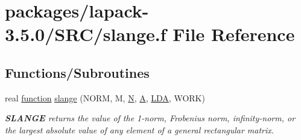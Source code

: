 \hypertarget{slange_8f}{}\section{packages/lapack-\/3.5.0/\+S\+R\+C/slange.f File Reference}
\label{slange_8f}
\subsection*{Functions/\+Subroutines}
\begin{DoxyCompactItemize}
\item 
real \hyperlink{afunc_8m_a7b5e596df91eadea6c537c0825e894a7}{function} \hyperlink{group__realGEauxiliary_ga459d27829607393670ef7de8a6914933}{slange} (N\+O\+R\+M, M, \hyperlink{polmisc_8c_a0240ac851181b84ac374872dc5434ee4}{N}, \hyperlink{classA}{A}, \hyperlink{example__user_8c_ae946da542ce0db94dced19b2ecefd1aa}{L\+D\+A}, W\+O\+R\+K)
\begin{DoxyCompactList}\small\item\em {\bfseries S\+L\+A\+N\+G\+E} returns the value of the 1-\/norm, Frobenius norm, infinity-\/norm, or the largest absolute value of any element of a general rectangular matrix. \end{DoxyCompactList}\end{DoxyCompactItemize}
